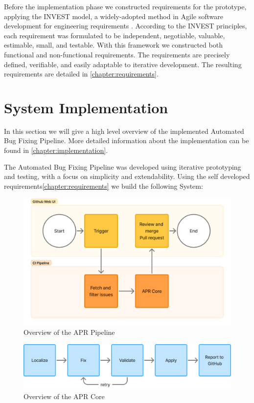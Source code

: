 Before the implementation phase we constructed requirements for the prototype, applying the INVEST model, a widely-adopted method in Agile software development for engineering requirements \cite{10.5555/984017}. According to the INVEST principles, each requirement was formulated to be independent, negotiable, valuable, estimable, small, and testable. With this framework we constructed both functional and non-functional requirements. The requirements are precisely defined, verifiable, and easily adaptable to iterative development. The resulting requirements are detailed in \ref{chapter:requirements}.

\section{System Implementation}

In this section we will give a high level overview of the implemented Automated Bug Fixing Pipeline. More detailed information about the implementation can be found in \ref{chapter:implementation}.

The Automated Bug Fixing Pipeline was developed using iterative prototyping and testing, with a focus on simplicity and extendability. Using the self developed requirements\ref{chapter:requirements} we build the following System:

\begin{figure}[H]
    \centering
    \includegraphics[width=1\textwidth]{images/flowcharts/overview.png}
    \caption{Overview of the APR Pipeline}
    \label{fig:high-level}
\end{figure}

\begin{figure}[H]
    \centering
    \includegraphics[width=1\textwidth]{images/flowcharts/apr_core_overview.png}
    \caption{Overview of the APR Core}
    \label{fig:apr-core-overview}
\end{figure}

